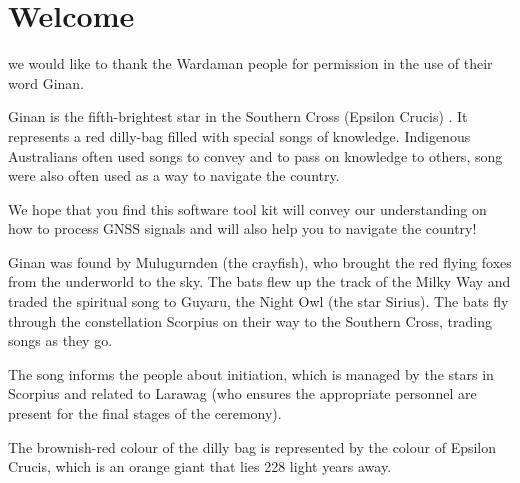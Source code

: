 \chapter{Welcome}
\label{ch:Ginan}


 we would like to thank the Wardaman people for permission in the use of their word Ginan. 

Ginan is the fifth-brightest star in the Southern Cross (Epsilon Crucis) . It represents a red dilly-bag filled with special songs of knowledge.
Indigenous Australians often used songs to convey and to pass on knowledge to others, song were also often used as a way to navigate the country.

We hope that you find this software tool kit will convey our understanding on how to process GNSS signals and will also help you to navigate the country!

 Ginan was found by Mulugurnden (the crayfish), who brought the red flying foxes from the underworld to the sky. The bats flew up the track of the Milky Way and traded the spiritual song to Guyaru, the Night Owl (the star Sirius). The bats fly through the constellation Scorpius on their way to the Southern Cross, trading songs as they go.

The song informs the people about initiation, which is managed by the stars in Scorpius and related to Larawag (who ensures the appropriate personnel are present for the final stages of the ceremony).

The brownish-red colour of the dilly bag is represented by the colour of Epsilon Crucis, which is an orange giant that lies 228 light years away.